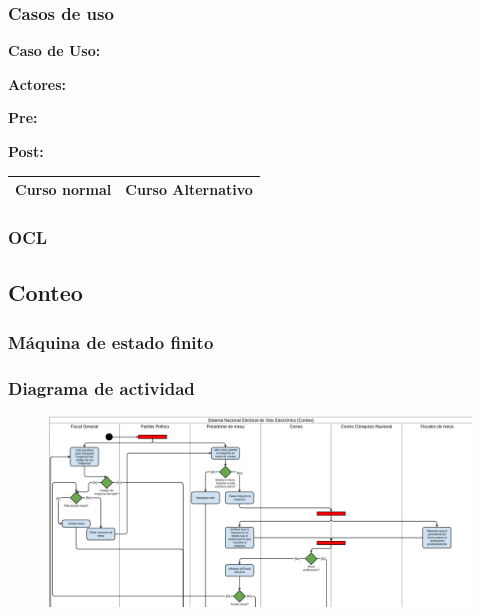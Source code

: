 \begin{figure}[H]
\centering
\end{figure}


\subsubsection{Casos de uso}


\textbf{Caso de Uso: }

\textbf{Actores:} 

\textbf{Pre:} 

\textbf{Post:}
\begin{table}[h!]
	
 \begin{tabular}{|p{7.5cm} | p{7.5cm}|} 
 \hline
 \textbf{Curso normal} & \textbf{Curso Alternativo} \\
 \hline

 \end{tabular}

\end{table}


\subsubsection{OCL}

\subsection{Conteo}

\subsubsection{Máquina de estado finito}

\subsubsection{Diagrama de actividad}
\begin{figure}[h!]
\centering
\includegraphics[scale=0.5]{imagenes/actividad/actividadConteo1}
\end{figure}

